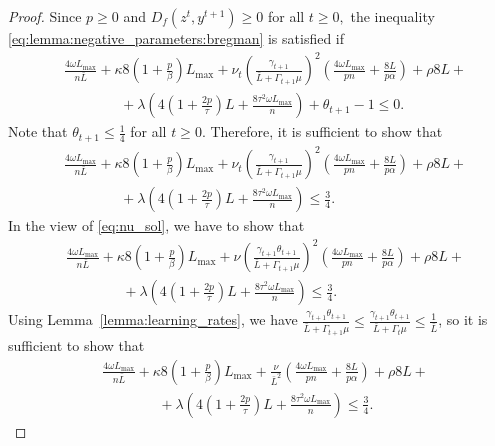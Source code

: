 \documentclass{article} %
\theoremstyle{plain}
\theoremstyle{definition}
\theoremstyle{remark}
\begin{document}
\begin{proof}
  Since $p \geq 0$ and $D_f(z^t, y^{t+1}) \geq 0$ for all $t \geq 0,$ the inequality \eqref{eq:lemma:negative_parameters:bregman} is satisfied if 
  \begin{equation*}
    \begin{aligned}
      &\frac{4 \omega L_{\max}}{n \bar{L}} + \kappa 8 \left(1 + \frac{p}{\beta}\right) L_{\max} + \nu_{t} \left(\frac{\gamma_{t+1}}{\bar{L} + \Gamma_{t+1} \mu}\right)^2\left(\frac{4 \omega L_{\max}}{p n} + \frac{8L}{p \alpha}\right) + \rho 8 L +  \\
    &\qquad\qquad+ \lambda \left(4 \left(1 + \frac{2 p}{\tau}\right) L + \frac{8 \tau^2 \omega L_{\max}}{n}\right) + \theta_{t+1} - 1 \leq 0.
    \end{aligned}
    \end{equation*}
    Note that $\theta_{t+1} \leq \frac{1}{4}$ for all $t \geq 0.$ Therefore, it is sufficient to show that
    \begin{equation*}
    \begin{aligned}
        &\frac{4 \omega L_{\max}}{n \bar{L}} + \kappa 8 \left(1 + \frac{p}{\beta}\right) L_{\max} + \nu_{t} \left(\frac{\gamma_{t+1}}{\bar{L} + \Gamma_{t+1} \mu}\right)^2\left(\frac{4 \omega L_{\max}}{p n} + \frac{8L}{p \alpha}\right) + \rho 8 L +  \\
      &\qquad\qquad+ \lambda \left(4 \left(1 + \frac{2 p}{\tau}\right) L + \frac{8 \tau^2 \omega L_{\max}}{n}\right) \leq \frac{3}{4}.
    \end{aligned}
    \end{equation*}
    In the view of \eqref{eq:nu_sol}, we have to show that
    \begin{equation*}
      \begin{aligned}
          &\frac{4 \omega L_{\max}}{n \bar{L}} + \kappa 8 \left(1 + \frac{p}{\beta}\right) L_{\max} + \widehat{\nu} \left(\frac{\gamma_{t+1} \theta_{t+1}}{\bar{L} + \Gamma_{t+1} \mu}\right)^2\left(\frac{4 \omega L_{\max}}{p n} + \frac{8L}{p \alpha}\right) + \rho 8 L +  \\
        &\qquad\qquad+ \lambda \left(4 \left(1 + \frac{2 p}{\tau}\right) L + \frac{8 \tau^2 \omega L_{\max}}{n}\right) \leq \frac{3}{4}.
    \end{aligned}
    \end{equation*}
    Using Lemma~\ref{lemma:learning_rates}, we have $\frac{\gamma_{t+1} \theta_{t+1}}{\bar{L} + \Gamma_{t+1} \mu} \leq \frac{\gamma_{t+1} \theta_{t+1}}{\bar{L} + \Gamma_{t} \mu} \leq \frac{1}{\bar{L}}$, so it is sufficient to show that
    \begin{equation}
      \begin{aligned}
          &\frac{4 \omega L_{\max}}{n \bar{L}} + \kappa 8 \left(1 + \frac{p}{\beta}\right) L_{\max} + \frac{\widehat{\nu}}{\bar{L}^2} \left(\frac{4 \omega L_{\max}}{p n} + \frac{8L}{p \alpha}\right) + \rho 8 L +  \\
        &\qquad\qquad+ \lambda \left(4 \left(1 + \frac{2 p}{\tau}\right) L + \frac{8 \tau^2 \omega L_{\max}}{n}\right) \leq \frac{3}{4}. \label{eq:bregman_where_to_sub}
    \end{aligned}
    \end{equation}
    

\end{proof}
\end{document}
